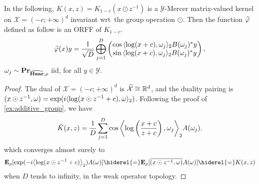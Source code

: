 \begin{example}
    In the following, $K(x,z)=K_{1-c}(x\odot z^{-1})$ is a $\mathcal{Y}$-Mercer
    matrix-valued kernel on $\mathcal{X}=(-c;+\infty)^d$ invariant
    \acs{wrt}~the group operation $\odot$. Then the function
    $\tildePhi{\omega}$ defined as follow is an \acl{ORFF} of $K_{1-c}$.
    \begin{dmath*}
        \tildePhi{\omega}(x) y=\frac{1}{\sqrt{D}}\Vect_{j=1}^D
        \begin{pmatrix}
            \cos{\inner{\log(x+c),\omega_j}_2}B(\omega_j)^\adjoint y \\
            \sin{\inner{\log(x+c),\omega_j}_2}B(\omega_j)^\adjoint y
        \end{pmatrix},
    \end{dmath*}
    $\omega_j \sim {\mathbf{{Pr}}}_{\widehat{\mathbf{Haar}},\rho}$ iid, for all
    $y\in\mathcal{Y}$.
\end{example}
\begin{proof}
    The dual of $\mathcal{X}=(-c;+\infty)^d$ is
    $\widehat{\mathcal{X}}\cong\mathbb{R}^d$, and the duality pairing is
    $(x \odot z^{-1},\omega)=\exp(i\langle\log(x\odot z^{-1}+c),
    \omega\rangle_2)$. Following the proof of \cref{ex:additive_group}, we have
    \begin{dmath*}
        \tilde{K}(x,z)
        = \frac{1}{D} \sum_{j=1}^D
        \cos{\inner*{\log\left(\frac{x+c}{z+c}\right), \omega_j}_2}A(\omega_j).
    \end{dmath*}
    which converges almost surely to
    \begin{dmath*}
        \expectation_{\rho}[\exp(-i\inner*{\log(x\odot z^{-1}+c)}_2)A(\omega) ]
        \hiderel{=} \expectation_{\rho}[\conj{\pairing{x\odot
        z^{-1},\omega}}A(\omega)]
        \hiderel{=} K(x, z)
    \end{dmath*}
    when $D$ tends to infinity, in the weak operator topology.
\end{proof}
